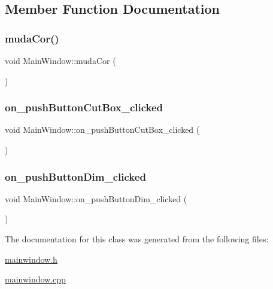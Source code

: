\subsection{Member Function Documentation}
\mbox{\label{class_main_window_ad82150906607387d5801606dba6495ac}} 
\subsubsection{\texorpdfstring{muda\+Cor()}{mudaCor()}}
{\footnotesize\ttfamily void Main\+Window\+::muda\+Cor (\begin{DoxyParamCaption}{ }\end{DoxyParamCaption})}

\mbox{\label{class_main_window_affe842d33f32e0433f150f1a5acef774}} 
\subsubsection{\texorpdfstring{on\+\_\+push\+Button\+Cut\+Box\+\_\+clicked}{on\_pushButtonCutBox\_clicked}}
{\footnotesize\ttfamily void Main\+Window\+::on\+\_\+push\+Button\+Cut\+Box\+\_\+clicked (\begin{DoxyParamCaption}{ }\end{DoxyParamCaption})\hspace{0.3cm}{\ttfamily [slot]}}

\mbox{\label{class_main_window_adc0db0162938df94fcb275684e6575a7}} 
\subsubsection{\texorpdfstring{on\+\_\+push\+Button\+Dim\+\_\+clicked}{on\_pushButtonDim\_clicked}}
{\footnotesize\ttfamily void Main\+Window\+::on\+\_\+push\+Button\+Dim\+\_\+clicked (\begin{DoxyParamCaption}{ }\end{DoxyParamCaption})\hspace{0.3cm}{\ttfamily [slot]}}



The documentation for this class was generated from the following files\+:\begin{DoxyCompactItemize}
\item 
\hyperlink{mainwindow_8h}{mainwindow.\+h}\item 
\hyperlink{mainwindow_8cpp}{mainwindow.\+cpp}\end{DoxyCompactItemize}
